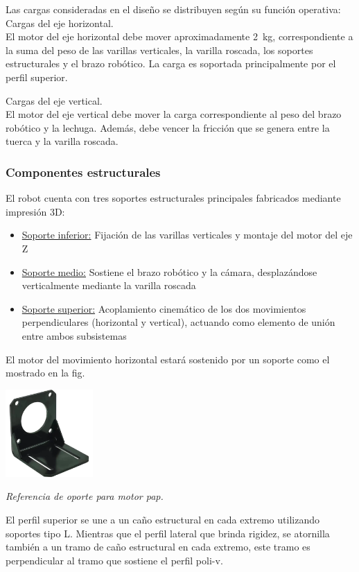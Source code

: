 Las cargas consideradas en el diseño se distribuyen según su función operativa:\\

Cargas del eje horizontal.\\
\noindent
El motor del eje horizontal debe mover aproximadamente 2~kg, correspondiente a la suma del peso de las varillas verticales, la varilla roscada, los soportes estructurales y el brazo robótico. La carga es soportada principalmente por el perfil superior.

Cargas del eje vertical.\\
\noindent
El motor del eje vertical debe mover la carga correspondiente al peso del brazo robótico y la lechuga. Además, debe vencer la fricción que se genera entre la tuerca y la varilla roscada.

\subsubsection{Componentes estructurales}

El robot cuenta con tres soportes estructurales principales fabricados mediante impresión 3D:

\begin{itemize}[label=$\bullet$]
    \item \underline{Soporte inferior:} Fijación de las varillas verticales y montaje del motor del eje Z
    \item \underline{Soporte medio:} Sostiene el brazo robótico y la cámara, desplazándose verticalmente mediante la varilla roscada
    \item \underline{Soporte superior:} Acoplamiento cinemático de los dos movimientos perpendiculares (horizontal y vertical), actuando como elemento de unión entre ambos subsistemas
\end{itemize}

El motor del movimiento horizontal estará sostenido por un soporte como el mostrado en la fig.
\begin{table}[h]
\centering
\includegraphics[width=0.25\textwidth]{img/soporte_motor_pap.png}
\caption{\textit{Referencia de oporte para motor pap.}}
\label{fig:soporte_motor_pap}
\end{table}
El perfil superior se une a un caño estructural en cada extremo utilizando soportes tipo L. Mientras que el perfil lateral que brinda rigidez, se atornilla también a un tramo de caño estructural en cada extremo, este tramo es perpendicular al tramo que sostiene el perfil poli-v.